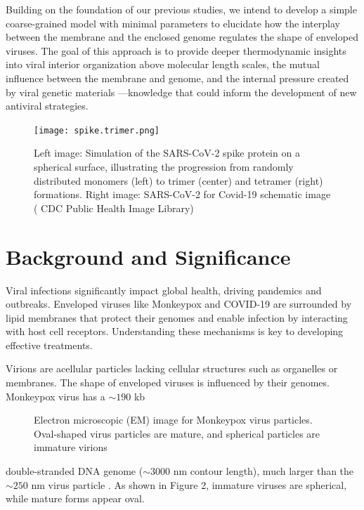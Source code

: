 \documentclass[12pt]{article}
\begin{document}
\begin{flushleft}
Building on the foundation of our previous studies, we intend to develop a simple coarse-grained model with minimal parameters to elucidate how the interplay between the membrane and the enclosed genome regulates the shape of enveloped viruses. The goal of this approach is to provide deeper thermodynamic insights into viral interior organization above molecular length scales, the mutual influence between the membrane and genome, and the internal pressure created by viral genetic materials —knowledge that could inform the development of new antiviral strategies.

\begin{figure}[!ht]
  \centering
  \texttt{[image: spike.trimer.png]}
  \caption{Left image: Simulation of the SARS-CoV-2 spike protein on a spherical surface, illustrating the progression from randomly distributed monomers (left) to trimer (center) and tetramer (right) formations. Right image: SARS-CoV-2 for Covid-19 schematic image ( CDC Public
Health Image Library) \cite{cdc-covid}}
\end{figure}

\section*{Background and Significance}


Viral infections significantly impact global health, driving pandemics and outbreaks. Enveloped viruses like Monkeypox and COVID-19 are surrounded by lipid membranes that protect their genomes and enable infection by interacting with host cell receptors. Understanding these mechanisms is key to developing effective treatments.

Virions are acellular particles lacking cellular structures such as organelles or membranes.
The shape of enveloped viruses is influenced by their genomes. Monkeypox virus has a $\sim190$ kb 

\begin{figure}[!ht]
  \centering  
  \caption{Electron microscopic (EM) image for
Monkeypox virus particles. Oval-shaped
virus particles are mature, and spherical
particles are immature virions \cite{goldsmith2003monkeypox}}
\end{figure}

\noindent double-stranded DNA genome ($\sim3000$ nm contour length), much larger than the $\sim250$ nm virus particle \cite{erez2019diagnosis}\cite{parker2007human}. As shown in Figure 2, immature viruses are spherical, while mature forms appear oval.



\end{flushleft}
\end{document}
